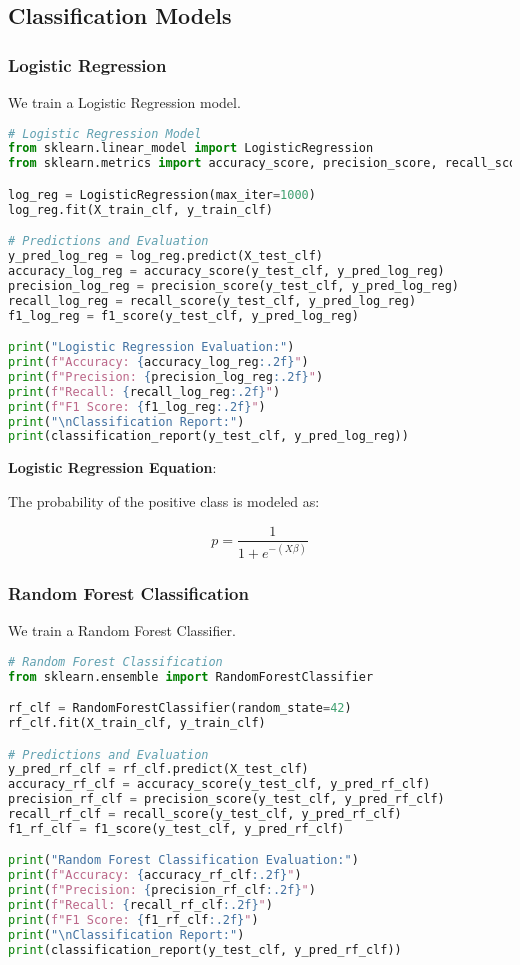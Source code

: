 \documentclass{article}
\begin{document}
\subsection{Classification Models}

\subsubsection{Logistic Regression}

We train a Logistic Regression model.

\begin{lstlisting}[language=Python]
# Logistic Regression Model
from sklearn.linear_model import LogisticRegression
from sklearn.metrics import accuracy_score, precision_score, recall_score, f1_score, classification_report

log_reg = LogisticRegression(max_iter=1000)
log_reg.fit(X_train_clf, y_train_clf)

# Predictions and Evaluation
y_pred_log_reg = log_reg.predict(X_test_clf)
accuracy_log_reg = accuracy_score(y_test_clf, y_pred_log_reg)
precision_log_reg = precision_score(y_test_clf, y_pred_log_reg)
recall_log_reg = recall_score(y_test_clf, y_pred_log_reg)
f1_log_reg = f1_score(y_test_clf, y_pred_log_reg)

print("Logistic Regression Evaluation:")
print(f"Accuracy: {accuracy_log_reg:.2f}")
print(f"Precision: {precision_log_reg:.2f}")
print(f"Recall: {recall_log_reg:.2f}")
print(f"F1 Score: {f1_log_reg:.2f}")
print("\nClassification Report:")
print(classification_report(y_test_clf, y_pred_log_reg))
\end{lstlisting}

\textbf{Logistic Regression Equation}:

The probability of the positive class is modeled as:

\[
p = \frac{1}{1 + e^{- (X \beta)}}
\]

\subsubsection{Random Forest Classification}

We train a Random Forest Classifier.

\begin{lstlisting}[language=Python]
# Random Forest Classification
from sklearn.ensemble import RandomForestClassifier

rf_clf = RandomForestClassifier(random_state=42)
rf_clf.fit(X_train_clf, y_train_clf)

# Predictions and Evaluation
y_pred_rf_clf = rf_clf.predict(X_test_clf)
accuracy_rf_clf = accuracy_score(y_test_clf, y_pred_rf_clf)
precision_rf_clf = precision_score(y_test_clf, y_pred_rf_clf)
recall_rf_clf = recall_score(y_test_clf, y_pred_rf_clf)
f1_rf_clf = f1_score(y_test_clf, y_pred_rf_clf)

print("Random Forest Classification Evaluation:")
print(f"Accuracy: {accuracy_rf_clf:.2f}")
print(f"Precision: {precision_rf_clf:.2f}")
print(f"Recall: {recall_rf_clf:.2f}")
print(f"F1 Score: {f1_rf_clf:.2f}")
print("\nClassification Report:")
print(classification_report(y_test_clf, y_pred_rf_clf))
\end{lstlisting}
\end{document}
